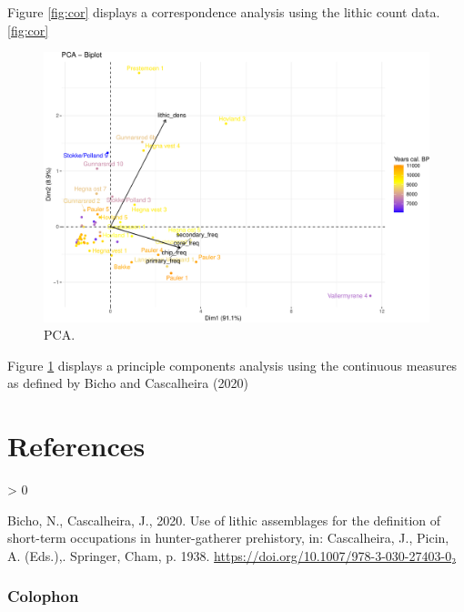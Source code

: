 \documentclass[
]{article}
\newlength{\cslhangindent}
\newenvironment{CSLReferences}[2] %
 {%
  \setlength{\parindent}{0pt}
  \ifodd #1 \everypar{\setlength{\hangindent}{\cslhangindent}}\ignorespaces\fi
  \ifnum #2 > 0
  \setlength{\parskip}{#2\baselineskip}
  \fi
 }%
 {}
\begin{document}
Figure \ref{fig:cor} displays a correspondence analysis using the lithic count data. \ref{fig:cor}

\begin{figure}
\centering
\includegraphics{../figures/pca-analysis-1.pdf}
\caption{\label{fig:pca-analysis}PCA.}
\end{figure}

Figure \ref{fig:pca-analysis} displays a principle components analysis using the continuous measures as defined by Bicho and Cascalheira (2020)

\newpage

\hypertarget{references}{%
\section{References}\label{references}}

\hypertarget{refs}{}
\begin{CSLReferences}{1}{0}
\leavevmode\hypertarget{ref-Bicho2020}{}%
Bicho, N., Cascalheira, J., 2020. Use of lithic assemblages for the definition of short-term occupations in hunter-gatherer prehistory, in: Cascalheira, J., Picin, A. (Eds.),. Springer, Cham, p. 1938. \url{https://doi.org/10.1007/978-3-030-27403-0₂}

\end{CSLReferences}

\newpage

\hypertarget{colophon}{%
\subsubsection{Colophon}\label{colophon}}
\end{document}
